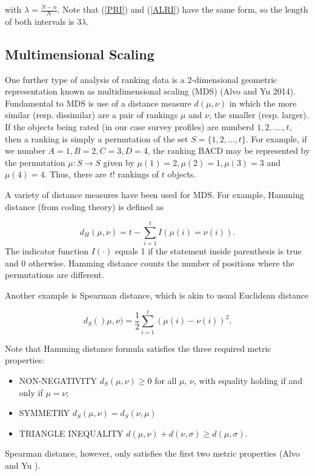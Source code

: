 \documentclass[a4paper, 12pt]{article}
\begin{document}
{\flushleft with $\lambda=\frac{N-n}{N}$. Note that (\ref{PRI}) and (\ref{ALRI}) have the same form, so the length of both intervals is $3\lambda$.

\subsection{Multimensional Scaling}
One further type of analysis of ranking data is a 2-dimensional geometric representation known as multidimensional scaling (MDS) (Alvo and Yu 2014). 
Fundamental to MDS is use of a distance measure $d(\mu,\nu)$ in which the more similar (resp. dissimilar) are a pair of rankings $\mu$ and $\nu$, the smaller (resp. larger).  If the objects being rated (in our case survey profiles) are numberd $1,2,....,t$, then a ranking is simply a permutation of the set $S=\{1,2,...,t\}$.  For example, if we number $A=1,B=2,C=3,D=4$,  the ranking BACD may be represented by the permutation $\mu: S\rightarrow S$ given by $\mu(1)=2,\mu(2)=1, \mu(3)=3$ and $\mu(4)=4$. Thus, there are $t!$ rankings of $t$ objects.   

 A variety of distance measures have been used for MDS. For example, Hamming distance (from coding theory) is defined as
 
 \begin{equation}
 d_H{(\mu,\nu)}=t-\sum_{i=1}^t I(\mu(i)=\nu(i)).
 \end{equation}
 {\flushleft The} indicator function $I(\cdot)$ equals 1 if the statement inside parenthesis is true and 0 otherwise.  Hamming distance counts the number of positions where the permutations are different.
 
 
 Another example is Spearman distance, which is akin to usual Euclidean distance

\begin{equation}
d_S{()\mu,\nu)}=\frac{1}{2}\sum_{i=1}^t(\mu(i)-\nu(i))^2.
\end{equation}

{\flushleft Note} that Hamming distance formula satisfies the three required metric properties:

\begin{itemize}
	\item NON-NEGATIVITY $d_S(\mu,\nu)\ge 0$ for all $\mu$, $\nu$, with equality holding if and only if $\mu=\nu$;
	\item SYMMETRY $d_S(\mu,\nu)=d_S(\nu,\mu)$ 
	\item TRIANGLE INEQUALITY $d(\mu,\nu)+d(\nu,\sigma)\ge d(\mu,\sigma)$.
\end{itemize}
{\flushleft Spearman distance}, however, only satisfies the first two metric properties (Alvo and Yu ).

}
\end{document}

